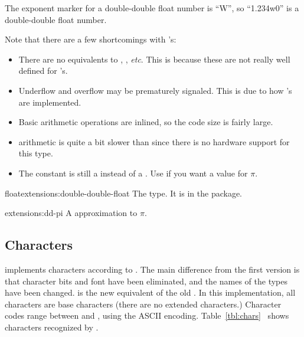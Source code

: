 The exponent marker for a double-double float number is ``W'', so
``1.234w0'' is a double-double float number.


Note that there are a few shortcomings with
's:
\begin{itemize}
 \item There are no equivalents to ,
   , \textit{etc}.  This is because
   these are not really well defined for 's.
 \item Underflow and overflow may be prematurely signaled.  This is
   due to how 's are implemented.
 \item Basic arithmetic operations are inlined, so the code size is
   fairly large.
 \item {} arithmetic is quite a bit slower
   than  since there is no hardware support for
   this type.
 \item The constant  is still a  instead
   of a .  Use  if you
   want a  value for $\pi$.
\end{itemize}

\begin{deftp}{float}{extensions:double-double-float}{}
  The  type.  It is in the 
  package.
\end{deftp}

\begin{defconst}{extensions:}{dd-pi}
  A  approximation to $\pi$.
\end{defconst}

\subsection{Characters}

\cmucl{} implements characters according to \cltltwo{}. The
main difference from the first version is that character bits and font
have been eliminated, and the names of the types have been changed.
 is the new equivalent of the old
. In this implementation, all characters are
base characters (there are no extended characters.) Character codes
range between  and , using the ASCII encoding.
Table~\ref{tbl:chars}~ shows characters recognized
by \cmucl.

